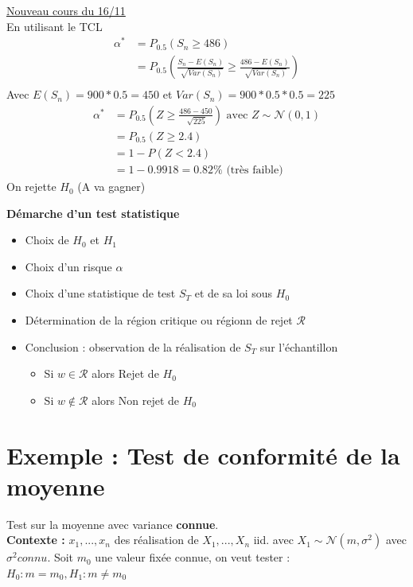 \documentclass{article}
\theoremstyle{plain}%
\theoremstyle{definition}
\theoremstyle{remark}
\begin{document}
\underline{Nouveau cours du 16/11} \\

En utilisant le TCL 
\begin{align*}
    \alpha ^* &= P_{0.5}(S_n \geq 486) \\
                &= P_{0.5}(\frac{S_n - E(S_n)}{\sqrt[]{Var(S_n)}} \geq \frac{486 - E(S_n)}{\sqrt[]{Var(S_n)}}) \\
\end{align*}
Avec $ E(S_n) = 900*0.5 = 450 $ et $ Var(S_n) =900*0.5*0.5 = 225 $ 
\begin{align*}
    \alpha ^* &= P_{0.5}(Z \geq \frac{486-450}{\sqrt[]{225}}) \text{ avec } Z \sim \mathcal{N}(0,1) \\
                &=P_{0.5} (Z \geq 2.4) \\
                &= 1 - P(Z < 2.4) \\
                &= 1 - 0.9918 = 0.82\% \text{ (très faible)}
\end{align*}
On rejette $ H_0 $ (A va gagner)


\textbf{Démarche d'un test statistique} 
\begin{itemize}
    \item Choix de $ H_0 $ et $ H_1 $ 
    \item Choix d'un risque $ \alpha  $ 
    \item Choix d'une statistique de test $ S_T $ et de sa loi sous $ H_0 $ 
    \item Détermination de la région critique ou régionn de rejet $ \mathcal{R} $ 
    \item Conclusion : observation de la réalisation de $ S_T $ sur l'échantillon 
        \begin{itemize}
            \item Si $ w \in \mathcal{R} $ alors Rejet de $H_0$
            \item Si $ w \not\in \mathcal{R} $ alors Non rejet de $ H_0 $ 
        \end{itemize}
\end{itemize}


\section{Exemple : Test de conformité de la moyenne}
Test sur la moyenne avec variance \textbf{connue}. \\
\textbf{Contexte : }$ x_1, ..., x_n $  des réalisation de $ X_1,..., X_n $ iid. avec $ X_1 \sim \mathcal{N}(m, \sigma ^2) $ avec $ \sigma ^2 connu $. Soit $ m_0 $ une valeur fixée connue, on veut tester : $ H_0: m = m_0, H_1: m \neq m_0 $ 
\end{document}
